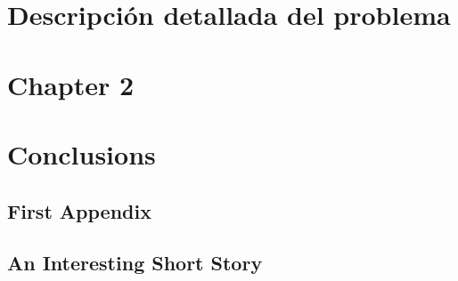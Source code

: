 \documentclass[pdftex,spanish]{pucthesis}	%
\begin{document}
\chapter[DESCRIPCIÓN DEL PROBLEMA]{Descripción detallada del problema}
\label{ch:descripcion-problema}


\chapter[CHAPTER 2]{Chapter 2} \label{ch2}


\chapter[CONCLUSIONS]{Conclusions}



\cleardoublepage
{} \label{references}

\renewcommand{\bibname}{REFERENCIAS}






\appendix %

\newpage
\section[First Appendix]{First Appendix}


\newpage
\section[An Interesting Short Story]{An Interesting Short Story}

\end{document}
